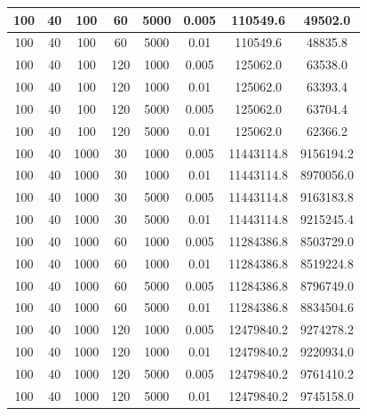 \documentclass[a4paper,12pt]{article}
\begin{document}
\begin{tabular}{|c|c|c|c|c|c|c|c|}
\hline
100&40&100&60&5000&0.005&110549.6&49502.0\\
\hline
100&40&100&60&5000&0.01&110549.6&48835.8\\
\hline
100&40&100&120&1000&0.005&125062.0&63538.0\\
\hline
100&40&100&120&1000&0.01&125062.0&63393.4\\
\hline
100&40&100&120&5000&0.005&125062.0&63704.4\\
\hline
100&40&100&120&5000&0.01&125062.0&62366.2\\
\hline
100&40&1000&30&1000&0.005&11443114.8&9156194.2\\
\hline
100&40&1000&30&1000&0.01&11443114.8&8970056.0\\
\hline
100&40&1000&30&5000&0.005&11443114.8&9163183.8\\
\hline
100&40&1000&30&5000&0.01&11443114.8&9215245.4\\
\hline
100&40&1000&60&1000&0.005&11284386.8&8503729.0\\
\hline
100&40&1000&60&1000&0.01&11284386.8&8519224.8\\
\hline
100&40&1000&60&5000&0.005&11284386.8&8796749.0\\
\hline
100&40&1000&60&5000&0.01&11284386.8&8834504.6\\
\hline
100&40&1000&120&1000&0.005&12479840.2&9274278.2\\
\hline
100&40&1000&120&1000&0.01&12479840.2&9220934.0\\
\hline
100&40&1000&120&5000&0.005&12479840.2&9761410.2\\
\hline
100&40&1000&120&5000&0.01&12479840.2&9745158.0\\
\hline
\end{tabular}
\end{document}
